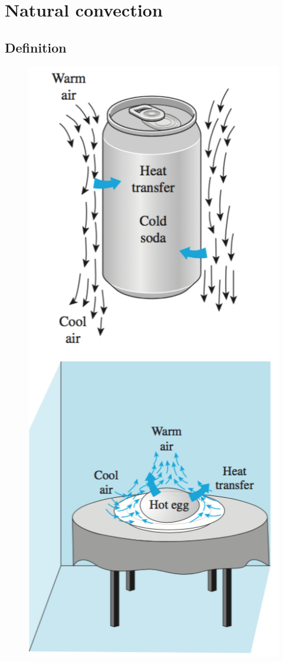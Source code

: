 \section{Natural convection}
	\subsection{Definition}
		\begin{figure}
		\vspace{-5 mm}
		\includegraphics[scale=0.3]{ch5/11}
		\end{figure}			
